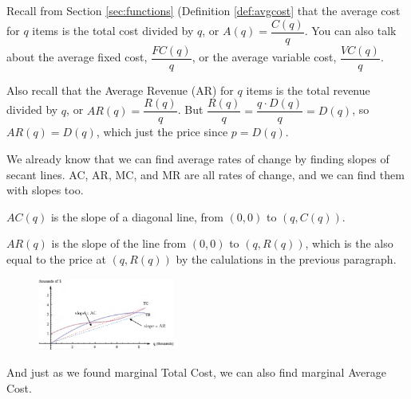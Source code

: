 Recall from Section \ref{sec:functions} (Definition \ref{def:avgcost} that the average cost for $q$ items is the total cost divided by $q$, or $A(q)=\dfrac{C(q)}{q}$. You can also talk about the average fixed cost, $\dfrac{FC(q)}{q}$, or the average variable cost, $\dfrac{VC(q)}{q}$.

Also recall that the Average Revenue (AR) for $q$ items is the total revenue divided by $q$, or $AR(q)=\dfrac{R(q)}{q}$. But $\dfrac{R(q)}{q} = \dfrac{q \cdot D(q)}{q}= D(q)$, so $AR(q)=D(q)$, which just the price since $p=D(q)$.

We already know that we can find average rates of change by finding slopes of secant lines. AC, AR, MC, and MR are all rates of change, and we can find them with slopes too.

$AC(q)$ is the slope of a diagonal line, from $(0, 0)$ to $(q,C(q))$.

$AR(q)$ is the slope of the line from $(0, 0)$ to $(q,R(q))$, which is the also equal to the price at $(q,R(q))$ by the calulations in the previous paragraph.

\begin{figure}[!ht]
  \centering
    \includegraphics[width=0.4\textwidth]{img/chap2/image113.png}
\end{figure}

And just as we found marginal Total Cost, we can also find marginal Average Cost.

